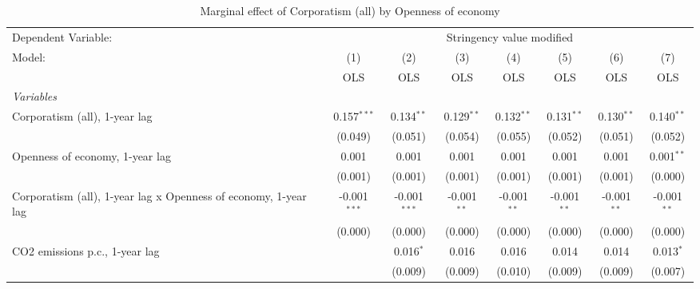 
\begin{table}[htbp]
   \caption{Marginal effect of Corporatism (all) by Openness of economy}
   \centering
   \begin{tabular}{lccccccc}
      \toprule
      Dependent Variable: & \multicolumn{7}{c}{Stringency value modified}\\
      Model:                                                          & (1)            & (2)            & (3)           & (4)           & (5)           & (6)           & (7)\\  
                                                                      &  OLS           & OLS            & OLS           & OLS           & OLS           & OLS           & OLS\\  
      \midrule
      \emph{Variables}\\
      Corporatism (all), 1-year lag                                   & 0.157$^{***}$  & 0.134$^{**}$   & 0.129$^{**}$  & 0.132$^{**}$  & 0.131$^{**}$  & 0.130$^{**}$  & 0.140$^{**}$\\   
                                                                      & (0.049)        & (0.051)        & (0.054)       & (0.055)       & (0.052)       & (0.051)       & (0.052)\\   
      Openness of economy, 1-year lag                                 & 0.001          & 0.001          & 0.001         & 0.001         & 0.001         & 0.001         & 0.001$^{**}$\\   
                                                                      & (0.001)        & (0.001)        & (0.001)       & (0.001)       & (0.001)       & (0.001)       & (0.000)\\   
      Corporatism (all), 1-year lag x Openness of economy, 1-year lag & -0.001$^{***}$ & -0.001$^{***}$ & -0.001$^{**}$ & -0.001$^{**}$ & -0.001$^{**}$ & -0.001$^{**}$ & -0.001$^{**}$\\   
                                                                      & (0.000)        & (0.000)        & (0.000)       & (0.000)       & (0.000)       & (0.000)       & (0.000)\\   
      CO2 emissions p.c., 1-year lag                                  &                & 0.016$^{*}$    & 0.016         & 0.016         & 0.014         & 0.014         & 0.013$^{*}$\\   
                                                                      &                & (0.009)        & (0.009)       & (0.010)       & (0.009)       & (0.009)       & (0.007)\\   

\end{tabular}
\end{table}
